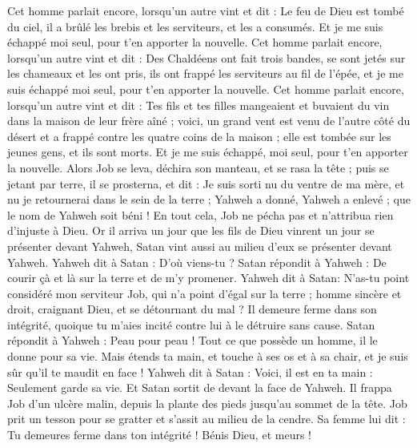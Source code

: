 \begin{multicols}{2}
Cet homme parlait encore, lorsqu'un autre vint et dit : Le feu de Dieu est tombé du ciel, il a brûlé les brebis et les serviteurs, et les a consumés. Et je me suis échappé moi seul, pour t'en apporter la nouvelle.
Cet homme parlait encore, lorsqu'un autre vint et dit : Des Chaldéens ont fait trois bandes, se sont jetés sur les chameaux et les ont pris, ils ont frappé les serviteurs au fil de l'épée, et je me suis échappé moi seul, pour t'en apporter la nouvelle.
Cet homme parlait encore, lorsqu'un autre vint et dit : Tes fils et tes filles mangeaient et buvaient du vin dans la maison de leur frère aîné ;
voici, un grand vent est venu de l'autre côté du désert et a frappé contre les quatre coins de la maison ; elle est tombée sur les jeunes gens, et ils sont morts. Et je me suis échappé, moi seul, pour t'en apporter la nouvelle.
Alors Job se leva, déchira son manteau, et se rasa la tête ; puis se jetant par terre, il se prosterna,
et dit : Je suis sorti nu du ventre de ma mère, et nu je retournerai dans le sein de la terre ; Yahweh a donné, Yahweh a enlevé ; que le nom de Yahweh soit béni !
En tout cela, Job ne pécha pas et n'attribua rien d'injuste à Dieu.
\VerseOne{}Or il arriva un jour  que les fils de Dieu vinrent un jour se présenter devant Yahweh, Satan vint aussi au milieu d'eux se présenter devant Yahweh.
Yahweh dit à Satan : D'où viens-tu ? Satan répondit à Yahweh : De courir çà et là sur la terre et de m'y promener.
Yahweh dit à Satan: N'as-tu point considéré mon serviteur Job, qui n'a point d'égal sur la terre ; homme sincère et droit, craignant Dieu, et se détournant du mal ? Il demeure ferme dans son intégrité, quoique tu m'aies incité contre lui à le détruire sans cause.
Satan répondit à Yahweh : Peau pour peau ! Tout ce que possède un homme, il le donne pour sa vie.
Mais étends ta main, et touche à ses os et à sa chair, et je suis sûr qu'il te maudit en face !
Yahweh dit à Satan : Voici, il est en ta main : Seulement garde sa vie.
Et Satan sortit de devant la face de Yahweh. Il frappa Job d'un ulcère malin, depuis la plante des pieds jusqu'au sommet de la tête.
Job prit un tesson pour se gratter et s'assit au milieu de la cendre.
Sa femme lui dit : Tu demeures ferme dans ton intégrité ! Bénis Dieu, et meurs !

\end{multicols}
